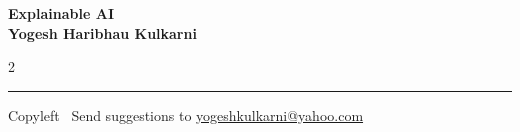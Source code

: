 \documentclass[8pt,landscape]{article}
\begin{document}
\footnotesize


\begin{center}
\Large{\textbf{Explainable AI\\ Yogesh Haribhau Kulkarni}}  
\end{center}

\begin{multicols}{2}


\end{multicols}

\rule{\linewidth}{0.25pt}
\scriptsize
Copyleft \textcopyleft\  Send suggestions to 
\href{http://yati.io}{yogeshkulkarni@yahoo.com}
\end{document}
